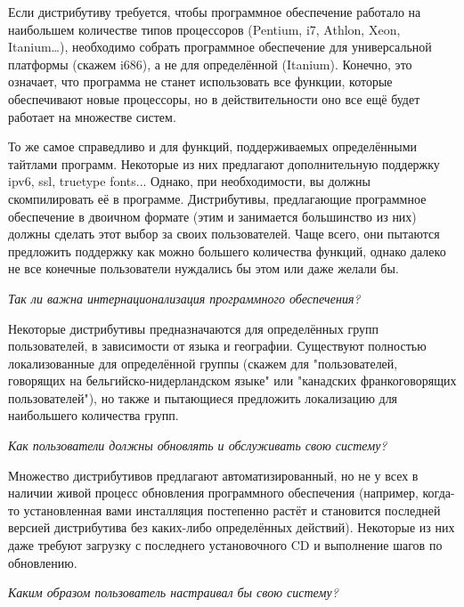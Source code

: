 \documentclass[10pt]{book}
\begin{document}
Если дистрибутиву требуется, чтобы программное обеспечение работало на наибольшем количестве типов процессоров (Pentium, i7, Athlon, Xeon, Itanium\ldots), необходимо  собрать программное обеспечение для универсальной платформы (скажем i686), а не для определённой (Itanium). Конечно, это означает, что программа не станет использовать все функции, которые обеспечивают новые процессоры, но в действительности оно все ещё будет работает на множестве систем.

То же самое справедливо и для функций, поддерживаемых определёнными тайтлами программ. Некоторые из них предлагают дополнительную поддержку ipv6, ssl, truetype fonts... Однако, при необходимости,  вы должны скомпилировать её в программе. Дистрибутивы, предлагающие программное обеспечение в двоичном формате (этим и занимается большинство из них) должны сделать этот выбор за своих пользователей.  Чаще всего, они пытаются предложить поддержку как можно большего количества функций, однако далеко не все конечные пользователи нуждались бы этом или даже желали бы.

\begin{flushright}
{\color{gentoo}\emph{Так ли важна интернационализация программного обеспечения?}}
\end{flushright}

Некоторые дистрибутивы предназначаются для определённых групп пользователей, в зависимости от языка и географии. Существуют  полностью локализованные для определённой группы (скажем для "пользователей, говорящих на бельгийско-нидерландском языке" или "канадских франкоговорящих пользователей"), но также и пытающиеся предложить локализацию для наибольшего количества групп.

\begin{flushright}
{\color{gentoo}\emph{Как пользователи должны обновлять и обслуживать свою систему?}}
\end{flushright}

Множество дистрибутивов предлагают автоматизированный, но не у всех в наличии живой процесс обновления программного обеспечения (например, когда-то установленная вами инсталляция постепенно растёт и становится последней версией дистрибутива без каких-либо определённых действий). Некоторые из них даже требуют загрузку с последнего установочного CD и выполнение шагов по обновлению.

\begin{flushright}
{\color{gentoo}\emph{Каким образом пользователь настраивал бы свою систему?}}
\end{flushright}
\end{document}
